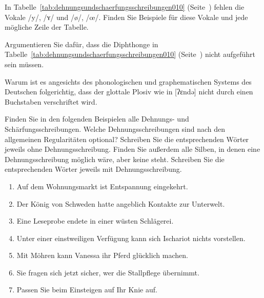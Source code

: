 
\Uebungen

 \label{exc:phonologischeschreibprinzipien01} In Tabelle~\ref{tab:dehnungsundschaerfungsschreibungen010} (Seite~\pageref{tab:dehnungsundschaerfungsschreibungen010}) fehlen die Vokale /y/, /ʏ/ und /ø/, /œ/.
Finden Sie Beispiele für diese Vokale und jede mögliche Zeile der Tabelle.

 \label{exc:phonologischeschreibprinzipien02} Argumentieren Sie dafür, dass die Diphthonge in Tabelle~\ref{tab:dehnungsundschaerfungsschreibungen010} (Seite~\pageref{tab:dehnungsundschaerfungsschreibungen010}) nicht aufgeführt sein müssen.

 \label{exc:phonologischeschreibprinzipien03} Warum ist es angesichts des phonologischen und graphematischen Systems des Deutschen folgerichtig, dass der glottale Plosiv wie in [ʔɛndə] nicht durch einen Buchstaben verschriftet wird.

 \label{exc:phonologischeschreibprinzipien04} Finden Sie in den folgenden Beispielen alle Dehnungs- und Schärfungsschreibungen.
Welche Dehnungsschreibungen sind nach den allgemeinen Regularitäten optional?
Schreiben Sie die entsprechenden Wörter jeweils ohne Dehnungsschreibung.
Finden Sie außerdem alle Silben, in denen eine Dehnungsschreibung möglich wäre, aber keine steht.
Schreiben Sie die entsprechenden Wörter jeweils mit Dehnungsschreibung.

\begin{enumerate}
  \item Auf dem Wohnungsmarkt ist Entspannung eingekehrt.
  \item Der König von Schweden hatte angeblich Kontakte zur Unterwelt.
  \item Eine Leseprobe endete in einer wüsten Schlägerei.
  \item Unter einer einstweiligen Verfügung kann sich Ischariot nichts vorstellen.
  \item Mit Möhren kann Vanessa ihr Pferd glücklich machen.
  \item Sie fragen sich jetzt sicher, wer die Stallpflege übernimmt.
  \item Passen Sie beim Einsteigen auf Ihr Knie auf.
\end{enumerate}

